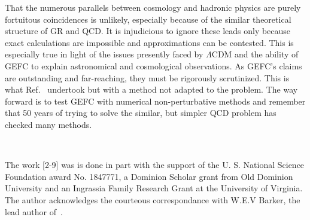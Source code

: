 \documentclass[superscriptaddress,amsmath,amssymb,nofootinbib]{revtex4}
\begin{document}
%
That the numerous parallels between cosmology and hadronic physics are purely fortuitous coincidences is unlikely, especially because of the similar theoretical structure of 
GR and QCD. It is injudicious to ignore these leads only because exact calculations are impossible and approximations can be contested. This is 
especially true in light of the issues presently faced by $\Lambda$CDM  and the ability of GEFC to explain astronomical and cosmological 
observations. As GEFC's claims are outstanding and far-reaching, they must be rigorously scrutinized. This is what Ref.~\cite{Barker:2023xsx} undertook but with a method 
not adapted to the problem. 
The way forward is to test GEFC with numerical non-perturbative methods 
and remember that
50 years of trying to solve the similar, but simpler QCD problem has checked many methods. 
 
 
 ~
 
 
 
The work [2-9] was is done in part with the support of the U. S. National Science Foundation award No. 1847771, a Dominion Scholar grant from Old Dominion University and an Ingrassia Family Research Grant at the University of Virginia. The author acknowledges the courteous correspondance with W.E.V Barker, the lead author of~\cite{Barker:2023xsx}. 
\end{document}
